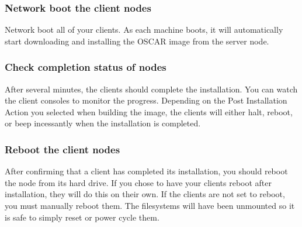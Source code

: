 \subsubsection{Network boot the client nodes}


Network boot all of your clients.  As each machine boots, it will
automatically start downloading and installing the OSCAR image from
the server node.


\subsubsection{Check completion status of nodes}
\label{det:client-finish}

After several minutes, the clients should complete the installation.
You can watch the client consoles to monitor the progress. Depending
on the Post Installation Action you selected when building the image,
the clients will either halt, reboot, or beep incessantly when the
installation is completed.



\subsubsection{Reboot the client nodes}

After confirming that a client has completed its installation, you
should reboot the node from its hard drive. If you chose to have your
clients reboot after installation, they will do this on their
own. If the clients are not set to reboot, you must manually
reboot them. The filesystems will have been unmounted so it is safe
to simply reset or power cycle them.


